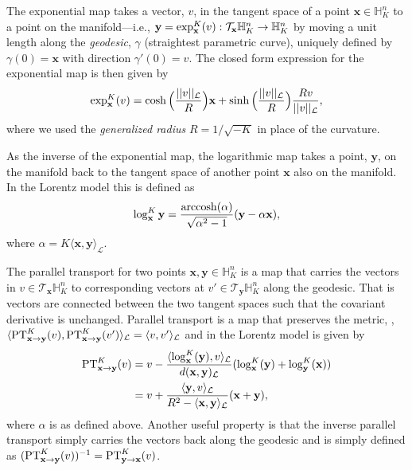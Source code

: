 The exponential map takes a vector, $v$, in the tangent space of a point $\textbf{x} \in \mathbb{H}^{n}_K$ to a point on the manifold---i.e., $\textbf{y} = \textnormal{exp}^K_\textbf{x}(v): \mathcal{T}_{\textbf{x}} \mathbb{H}^{n}_K \to \mathbb{H}^{n}_K$ by moving a unit length along the \textit{geodesic}, $\gamma$ (straightest parametric curve), uniquely defined by $\gamma(0) = \textbf{x}$ with direction $\gamma '(0)= v$. The closed form expression for the exponential map is then given by
\begin{equation}
    \label{eqn:exp_map}
    \textnormal{exp}^K_{\textbf{x}} (v) = \cosh \Big(\frac{||v||_{\mathcal{L}}}{R} \Big)\textbf{x} +  \sinh \Big(\frac{||v||_{\mathcal{L}}}{R} \Big)\frac{Rv}{||{v}||_{\mathcal{L}}},
\end{equation}
where we used the \textit{generalized radius} $R = 1/\sqrt{-K}$ in place of the curvature.

As the inverse of the exponential map, the logarithmic map takes a point, $\textbf{y}$, on the manifold back to the tangent space of another point $\textbf{x}$ also on the manifold. In the Lorentz model this is defined as
\begin{equation}
    \label{eqn:log_map}
    \log^K_{\textbf{x}}{\textbf{y}} = \frac{\operatorname{arccosh}(\alpha)}{\sqrt{\alpha^2 - 1}}(\textbf{y} - \alpha \textbf{x}),
\end{equation}
where $\alpha = K\langle \textbf{x}, \textbf{y} \rangle_{\mathcal{L}}$.

The parallel transport for two points $\textbf{x},\textbf{y} \in \mathbb{H}^{n}_K$ is a map that carries the vectors in $v \in \mathcal{T}_{\textbf{x}}\mathbb{H}^{n}_K$ to corresponding vectors at $v' \in \mathcal{T}_{\textbf{y}}\mathbb{H}^{n}_K$ along the geodesic. That is vectors are connected between the two tangent spaces such that the covariant derivative is unchanged. Parallel transport is a map that preserves the metric, \ie, $\langle \textnormal{PT}^K_{\textbf{x} \to \textbf{y}}(v), \textnormal{PT}^K_{\textbf{x} \to \textbf{y}}(v') \rangle_{\mathcal{L}} = \langle v, v' \rangle_{\mathcal{L}}$ and in the Lorentz model is given by
\begin{align}
    \label{eqn:parallel_transport}
    \textnormal{PT}^K_{\textbf{x} \to \textbf{y}}(v) & = v - \frac{ \langle \log^K_{\textbf{x}}(\textbf{y}), v \rangle_{\mathcal{L}}}{d(\textbf{x},\textbf{y})_{\mathcal{L}}} (\log^K_{\textbf{x}}(\textbf{y})+ \log^K_{\textbf{y}}(\textbf{x})) \nonumber \\
    & = v + \frac{ \langle \textbf{y}, v \rangle_{\mathcal{L}}}{R^2 - \langle \textbf{x}, \textbf{y} \rangle_{\mathcal{L}}} (\textbf{x}+ \textbf{y}),
\end{align}
where $\alpha$ is as defined above. Another useful property is that the inverse parallel transport simply carries the vectors back along the geodesic and is simply defined as $(\textnormal{PT}^{K}_{\textbf{x} \to \textbf{y}}(v))^{-1} = \textnormal{PT}^K_{\textbf{y} \to \textbf{x}}(v)$.


